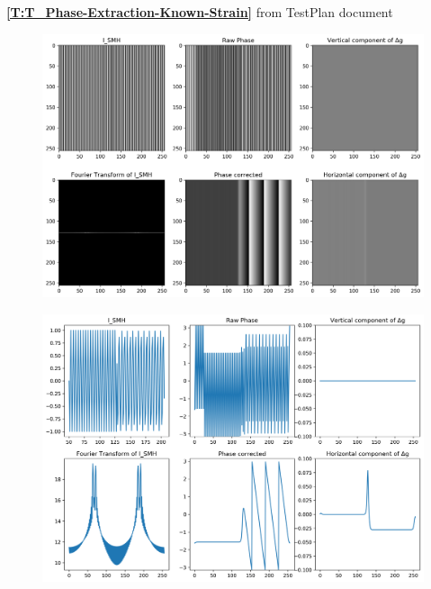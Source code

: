 \documentclass[12pt, titlepage]{article}
\begin{document}
\textbf{\cref{T:T_Phase-Extraction-Known-Strain}} from TestPlan document

\begin{figure}[H]
\begin{center}
\includegraphics[scale=0.5]{Figures/Test_3_explanation.png}
\caption{}
\label{fig:Test_3_explaination}
\end{center}
\end{figure}

\begin{figure}[H]
\begin{center}
\includegraphics[scale=0.5]{Figures/Test_3_explanation_1D.png}
\caption{}
\label{fig:Test_3_explaination_1D}
\end{center}
\end{figure}
\end{document}

